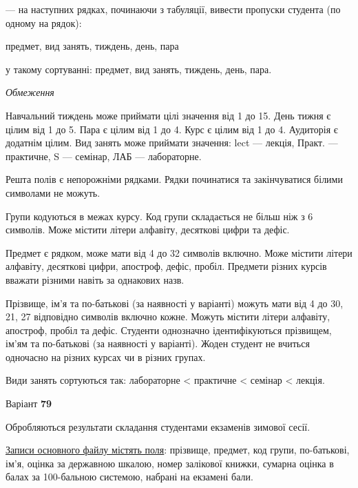 \documentclass[11pt, ukrainian]{article}
\begin{document}
{\noindent}--- на наступних рядках, починаючи з табуляції, вивести пропуски студента (по одному на рядок):\par
предмет, вид занять, тиждень, день, пара

{\noindent}у такому сортуванні: предмет, вид занять, тиждень, день, пара.


\bigskip\textit{Обмеження}

Навчальний тиждень може приймати цілі значення від 1 до 15.
День тижня є цілим від 1 до 5. Пара є цілим від 1 до 4.
Курс є цілим від 1 до 4. Аудиторія є додатнім цілим.
Вид занять може приймати значення:
lect --- лекція, Практ. --- практичне, S --- семінар, ЛАБ --- лабораторне.

Решта полів є непорожніми рядками.
Рядки починатися та закінчуватися білими символами не можуть.

Групи кодуються в межах курсу.
Код групи складається не більш ніж з 6 символів.
Може містити літери алфавіту, десяткові цифри та дефіс.

Предмет є рядком, може мати від 4 до 32 символів включно.
Може містити літери алфавіту, десяткові цифри, апостроф, дефіс, пробіл.
Предмети різних курсів вважати різними навіть за однакових назв.

Прізвище, ім’я та по-батькові (за наявності у варіанті)
можуть мати від 4 до 30, 21, 27 відповідно символів включно кожне.
Можуть містити літери алфавіту, апостроф, пробіл та дефіс.
Студенти однозначно ідентифікуються прізвищем, ім’ям та по-батькові (за наявності у варіанті).
Жоден студент не вчиться одночасно на різних курсах чи в різних групах.

Види занять сортуються так: лабораторне < практичне < семінар < лекція.





\par
\newpage
{\center Варіант  \No \textbf { 79 }\par}
\bigskip
Обробляються результати складання студентами екзаменів зимової сесії.

\underline{Записи основного файлу містять поля}: прізвище, предмет, код групи, по-батькові, ім’я, оцінка за державною шкалою, номер залікової книжки, сумарна оцінка в балах за 100-бальною системою, набрані на екзамені бали.
\end{document}
